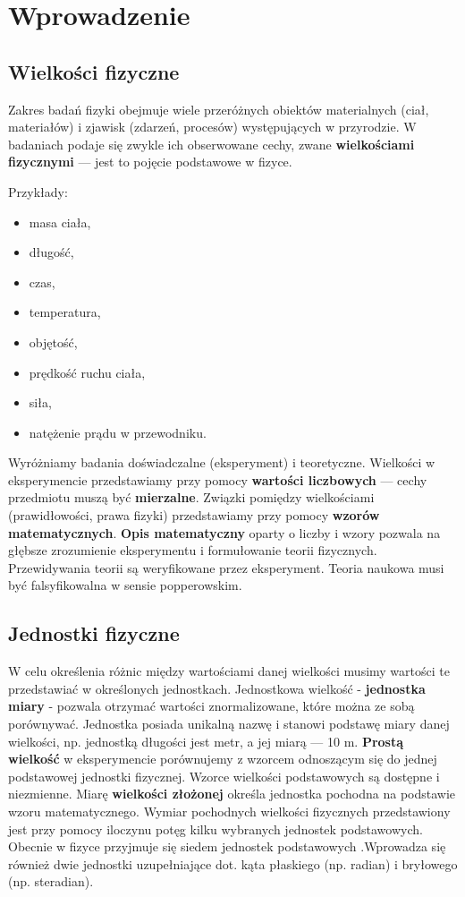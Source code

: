 \documentclass[../Fizyka.tex]{subfiles}
\begin{document}
    \section{Wprowadzenie}
    \subsection{Wielkości fizyczne}
    Zakres badań fizyki obejmuje wiele przeróżnych obiektów materialnych (ciał, materiałów) i zjawisk (zdarzeń, procesów) występujących w przyrodzie.
    W badaniach podaje się zwykle ich obserwowane cechy, zwane \textbf{wielkościami fizycznymi} — jest to pojęcie podstawowe w fizyce.
    
    Przykłady:
    \begin{itemize}
        \item masa ciała, 
        \item długość, 
        \item czas, 
        \item temperatura, 
        \item objętość,
        \item prędkość ruchu ciała, 
        \item siła, 
        \item natężenie prądu w przewodniku.
    \end{itemize}

    Wyróżniamy badania doświadczalne (eksperyment) i teoretyczne. Wielkości w eksperymencie przedstawiamy przy pomocy \textbf{wartości
    liczbowych} — cechy przedmiotu muszą być \textbf{mierzalne}. Związki pomiędzy wielkościami (prawidłowości, prawa fizyki)
    przedstawiamy przy pomocy \textbf{wzorów matematycznych}. \textbf{Opis matematyczny} oparty o liczby i wzory pozwala na głębsze
    zrozumienie eksperymentu i formułowanie teorii fizycznych. Przewidywania teorii są weryfikowane przez eksperyment.
    Teoria naukowa musi być falsyfikowalna w sensie popperowskim.

    \subsection{Jednostki fizyczne}
    W celu określenia różnic między wartościami danej wielkości musimy wartości te przedstawiać w określonych jednostkach.
    Jednostkowa wielkość - \textbf{jednostka miary} - pozwala otrzymać wartości znormalizowane, które można ze sobą porównywać.
    Jednostka posiada unikalną nazwę i stanowi podstawę miary danej wielkości, np. jednostką długości jest metr, a jej miarą — 10 m.
    \textbf{Prostą wielkość} w eksperymencie porównujemy z wzorcem odnoszącym się do jednej podstawowej jednostki fizycznej.
    Wzorce wielkości podstawowych są dostępne i niezmienne. Miarę \textbf{wielkości złożonej} określa jednostka pochodna na podstawie wzoru matematycznego.
    Wymiar pochodnych wielkości fizycznych przedstawiony jest przy pomocy iloczynu potęg kilku wybranych jednostek podstawowych.
    Obecnie w fizyce przyjmuje się siedem jednostek podstawowych .Wprowadza się również dwie jednostki uzupełniające dot. kąta
    płaskiego (np. radian) i bryłowego (np. steradian).
\end{document}
